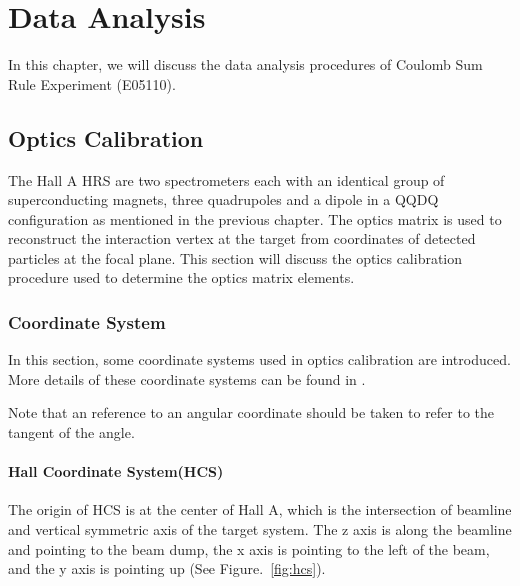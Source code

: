 

\chapter{Data Analysis}
\label{Data_Analysis}

In this chapter, we will discuss the data analysis procedures
of Coulomb Sum Rule Experiment (E05110).

\section{Optics Calibration}
\label{Optics_Calibration}

The Hall A HRS are two spectrometers each with an identical group of superconducting magnets,
three quadrupoles and a dipole in a QQDQ configuration as mentioned in the previous chapter.
The optics matrix is used to reconstruct the interaction vertex at the target from coordinates
of detected particles at the focal plane. This section will discuss the optics calibration procedure
used to determine the optics matrix elements.

\subsection[Coordinate System]{Coordinate System}
\label{Coordinate_System}
In this section, some coordinate systems used in optics calibration are
introduced. More details of these coordinate systems can be found in .

Note that an reference to an angular coordinate should be taken to refer
to the tangent of the angle.

\subsubsection{Hall Coordinate System(HCS)}

The origin of HCS is at the center of Hall A, which is the intersection of
beamline and vertical symmetric axis of the target system. The z axis is
along the beamline and pointing to the beam dump, the x axis is pointing to
the left of the beam, and the y axis is pointing up (See Figure.~\ref{fig:hcs}).

